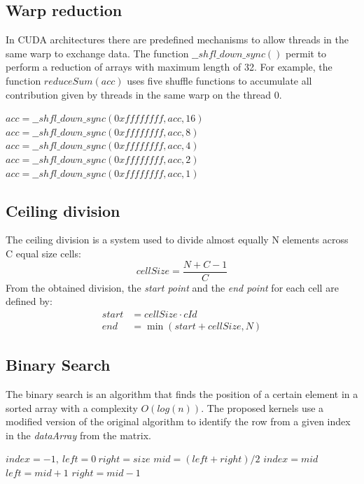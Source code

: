 \documentclass[conference]{IEEEtran}
\begin{document}
\subsection{Warp reduction}
In CUDA architectures there are predefined mechanisms to allow threads in the same warp to exchange data. The function $\_\_shfl\_down\_sync()$ permit to perform a reduction of arrays with maximum length of 32.
For example, the function $reduceSum(acc)$ uses five shuffle functions to accumulate all contribution given by threads in the same warp on the thread 0. 

\begin{algorithm}[h]
\small
\caption{Warp reduction system}
\begin{algorithmic}[1]
\State $acc=\_\_shfl\_down\_sync(0xffffffff,acc,16)$
\State $acc=\_\_shfl\_down\_sync(0xffffffff,acc,8)$
\State $acc=\_\_shfl\_down\_sync(0xffffffff,acc,4)$
\State $acc=\_\_shfl\_down\_sync(0xffffffff,acc,2)$
\State $acc=\_\_shfl\_down\_sync(0xffffffff,acc,1)$
\EndProcedure
\end{algorithmic}
\label{alg:reduceSum}
\end{algorithm}
\subsection{Ceiling division}
The ceiling division is a system used to divide almost equally N elements across C equal size cells:
\begin{equation}
cellSize=\frac{N + C - 1}{C}
\label{eq:ceiling}
\end{equation}
From the obtained division, the {\it{start point}} and the {\it{end point}} for each cell are defined by:
\begin{equation}
\begin{aligned}
start &= cellSize \cdot cId\\
end &= \min(start + cellSize, N)
\end{aligned}
\end{equation}

\subsection{Binary Search}
The binary search is an algorithm that finds the position of a certain element in a sorted array with a complexity $O(log(n))$. The proposed kernels use a modified version 
of the original algorithm to identify the row from a given index in the {\it{dataArray}} from the matrix.  
\begin{algorithm}[h]
\small
\caption{Adapted binary search}
\begin{algorithmic}[1]
\State $index=-1,\ left=0\ right=size$
\State $mid=(left+right)/2$
\State $index=mid$
\State $left=mid+1$
\Else 
\State $right=mid-1$
\EndIf
\EndWhile
\EndProcedure
\end{algorithmic}
\label{alg:binarySearch}
\end{algorithm}
\end{document}
